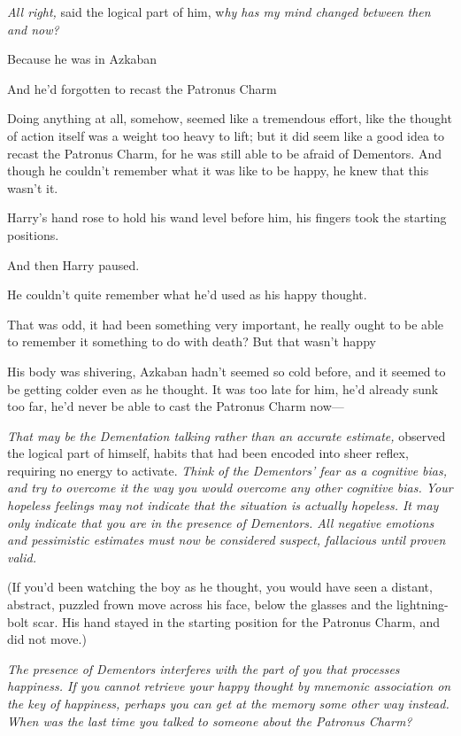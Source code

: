 \emph{All right,} said the logical part of him, w\emph{hy has my mind changed
between then and now?}

Because he was in Azkaban{\el}

And he'd forgotten to recast the Patronus Charm{\el}

Doing anything at all, somehow, seemed like a tremendous effort, like the
thought of action itself was a weight too heavy to lift; but it did seem like a
good idea to recast the Patronus Charm, for he was still able to be afraid of
Dementors. And though he couldn't remember what it was like to be happy, he
knew that this wasn't it.

Harry's hand rose to hold his wand level before him, his fingers took the
starting positions.

And then Harry paused.

He couldn't{\el} quite remember{\el} what he'd used as his happy thought.

That was odd, it had been something very important, he really ought to be able
to remember it{\el} something to do with death? But that wasn't happy{\el}

His body was shivering, Azkaban hadn't seemed so cold before, and it seemed to
be getting colder even as he thought. It was too late for him, he'd already
sunk too far, he'd never be able to cast the Patronus Charm now—

\emph{That may be the Dementation talking rather than an accurate estimate,}
observed the logical part of himself, habits that had been encoded into sheer
reflex, requiring no energy to activate. \emph{Think of the Dementors' fear as
a cognitive bias, and try to overcome it the way you would overcome any other
cognitive bias. Your hopeless feelings may not indicate that the situation is
actually hopeless. It may only indicate that you are in the presence of
Dementors. All negative emotions and pessimistic estimates must now be
considered suspect, fallacious until proven valid.}

(If you'd been watching the boy as he thought, you would have seen a distant,
abstract, puzzled frown move across his face, below the glasses and the
lightning-bolt scar. His hand stayed in the starting position for the Patronus
Charm, and did not move.)

\emph{The presence of Dementors interferes with the part of you that processes
happiness. If you cannot retrieve your happy thought by mnemonic association on
the key of happiness, perhaps you can get at the memory some other way instead.
When was the last time you talked to someone about the Patronus Charm?}

